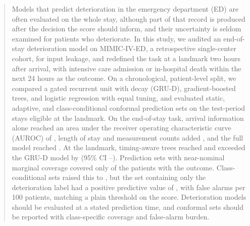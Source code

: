 \begin{abstract}
Models that predict deterioration in the emergency department (ED) are often evaluated on the whole stay, although part of that record is produced after the decision the score should inform, and their uncertainty is seldom examined for patients who deteriorate. In this study, we audited an end-of-stay deterioration model on MIMIC-IV-ED, a retrospective single-center cohort, for input leakage, and redefined the task at a landmark two hours after arrival, with intensive care admission or in-hospital death within the next 24 hours as the outcome. On a chronological, patient-level split, we compared a gated recurrent unit with decay (GRU-D), gradient-boosted trees, and logistic regression with equal tuning, and evaluated static, adaptive, and class-conditional conformal prediction sets on the \RVHtwoTestEligible{} test-period stays eligible at the landmark. On the end-of-stay task, arrival information alone reached an area under the receiver operating characteristic curve (AUROC) of \RVIncArr{}, length of stay and measurement counts added \RVIncWorkOverArr{}, and the full model reached \RVEosHybridAuroc{}. At the landmark, timing-aware trees reached \RVAurocXgbT{} and exceeded the GRU-D model by \RVTreesOverHybrid{} (95\% CI \RVTreesOverHybridLo{}--\RVTreesOverHybridHi{}). Prediction sets with near-nominal marginal coverage covered only \RVSetCovOneStaticLac{} of the patients with the outcome. Class-conditional sets raised this to \RVSetCovOneMondEci{}, but the set containing only the deterioration label had a positive predictive value of \RVSetPpvMondEci{}, with \RVSetFaMondEci{} false alarms per 100 patients, matching a plain threshold on the score. Deterioration models should be evaluated at a stated prediction time, and conformal sets should be reported with class-specific coverage and false-alarm burden.
\end{abstract}
